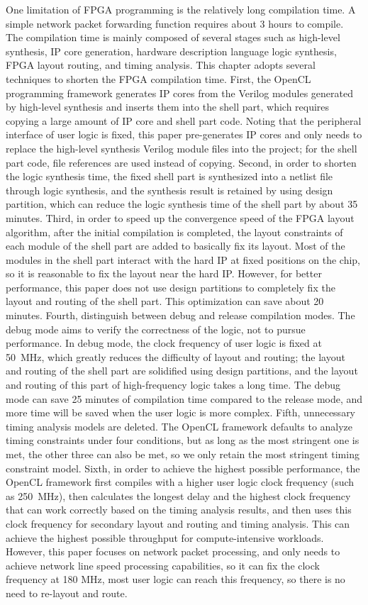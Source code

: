 One limitation of FPGA programming is the relatively long compilation time. A simple network packet forwarding function requires about 3 hours to compile. The compilation time is mainly composed of several stages such as high-level synthesis, IP core generation, hardware description language logic synthesis, FPGA layout routing, and timing analysis.
This chapter adopts several techniques to shorten the FPGA compilation time.
First, the OpenCL programming framework generates IP cores from the Verilog modules generated by high-level synthesis and inserts them into the shell part, which requires copying a large amount of IP core and shell part code. Noting that the peripheral interface of user logic is fixed, this paper pre-generates IP cores and only needs to replace the high-level synthesis Verilog module files into the project; for the shell part code, file references are used instead of copying.
Second, in order to shorten the logic synthesis time, the fixed shell part is synthesized into a netlist file through logic synthesis, and the synthesis result is retained by using design partition, which can reduce the logic synthesis time of the shell part by about 35 minutes.
Third, in order to speed up the convergence speed of the FPGA layout algorithm, after the initial compilation is completed, the layout constraints of each module of the shell part are added to basically fix its layout. Most of the modules in the shell part interact with the hard IP at fixed positions on the chip, so it is reasonable to fix the layout near the hard IP. However, for better performance, this paper does not use design partitions to completely fix the layout and routing of the shell part. This optimization can save about 20 minutes.
Fourth, distinguish between debug and release compilation modes. The debug mode aims to verify the correctness of the logic, not to pursue performance. In debug mode, the clock frequency of user logic is fixed at 50~MHz, which greatly reduces the difficulty of layout and routing; the layout and routing of the shell part are solidified using design partitions, and the layout and routing of this part of high-frequency logic takes a long time. The debug mode can save 25 minutes of compilation time compared to the release mode, and more time will be saved when the user logic is more complex.
Fifth, unnecessary timing analysis models are deleted. The OpenCL framework defaults to analyze timing constraints under four conditions, but as long as the most stringent one is met, the other three can also be met, so we only retain the most stringent timing constraint model.
Sixth, in order to achieve the highest possible performance, the OpenCL framework first compiles with a higher user logic clock frequency (such as 250~MHz), then calculates the longest delay and the highest clock frequency that can work correctly based on the timing analysis results, and then uses this clock frequency for secondary layout and routing and timing analysis. This can achieve the highest possible throughput for compute-intensive workloads. However, this paper focuses on network packet processing, and only needs to achieve network line speed processing capabilities, so it can fix the clock frequency at 180 MHz, most user logic can reach this frequency, so there is no need to re-layout and route.

